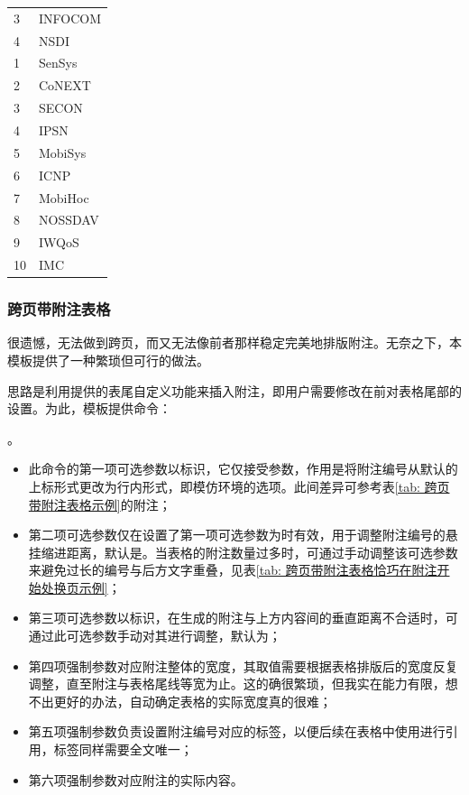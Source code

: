 \documentclass[QingNianC, vlined, timesmathnogreek]{nsfc}
\begin{document}
\begin{longtable}{p{2em} p{4.5em}}
		3 & INFOCOM \\
		4 & NSDI \\
		1 & SenSys \\
		2 & CoNEXT \\
		3 & SECON \\
		4 & IPSN \\
		5 & MobiSys \\
		6 & ICNP \\
		7 & MobiHoc \\
		8 & NOSSDAV \\
		9 & IWQoS \\
		10 & IMC \\
	\end{longtable}

	\clearpage
	\subsubsection{跨页带附注表格}

	很遗憾，无法做到跨页，而又无法像前者那样稳定完美地排版附注。无奈之下，本模板提供了一种繁琐但可行的做法。

	思路是利用提供的表尾自定义功能来插入附注，即用户需要修改在前对表格尾部的设置。为此，模板提供命令：
	
	。

	\begin{itemize}
		\item 此命令的第一项可选参数以\shad{()}标识，它仅接受参数，作用是将附注编号从默认的上标形式更改为行内形式，即模仿环境的选项。此间差异可参考表\ref{tab: 跨页带附注表格示例}的附注；
		\item 第二项可选参数仅在设置了第一项可选参数为时有效，用于调整附注编号的悬挂缩进距离，默认是\shad{1em}。当表格的附注数量过多时，可通过手动调整该可选参数来避免过长的编号与后方文字重叠，见表\ref{tab: 跨页带附注表格恰巧在附注开始处换页示例}；
		\item 第三项可选参数以\shad{[]}标识，在生成的附注与上方内容间的垂直距离不合适时，可通过此可选参数手动对其进行调整，默认为\shad{0bp}；
		\item 第四项强制参数对应附注整体的宽度，其取值需要根据表格排版后的宽度反复调整，直至附注与表格尾线等宽为止。这的确很繁琐，但我实在能力有限，想不出更好的办法，自动确定表格的实际宽度真的很难；
		\item 第五项强制参数负责设置附注编号对应的标签，以便后续在表格中使用进行引用，标签同样需要全文唯一；
		\item 第六项强制参数对应附注的实际内容。
	\end{itemize}
\end{document}
